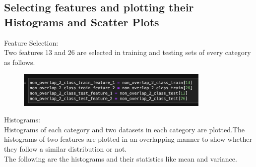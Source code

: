 \documentclass[conference]{IEEEtran}
\begin{document}
\subsection{Selecting features and plotting their Histograms and Scatter Plots}
Feature Selection: \\
Two features 13 and 26 are selected in training and testing sets of every category as follows.
\begin{figure}[!htbp]
    \centering
    \includegraphics[height=1.7cm]{task1.3.png} 
   
    \label{fig:my_label}
\end{figure}
Histograms: \\
Histograms of each category and two datasets in each category are plotted.The histograms of two features are plotted in an overlapping manner to show whether they follow a similar distribution or not. \\
The following are the histograms and their statistics like mean and variance.
\end{document}
